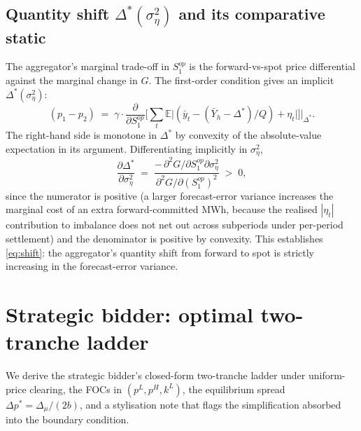 \documentclass[11pt]{article}
\begin{document}
\subsection{Quantity shift $\Delta^*(\sigma_\eta^2)$ and its comparative static}\label{app:aggregator:shift}
The aggregator's marginal trade-off in $S^{op}_1$ is the forward-vs-spot price differential against the marginal change in $G$. The first-order condition gives an implicit $\Delta^*(\sigma_\eta^2)$:
\begin{equation}
(p_1 - p_2) \;=\; \gamma \cdot \frac{\partial}{\partial S^{op}_1}\!\bigg[\sum_t \mathbb{E}\big|(\bar y_t - (\bar Y_h - \Delta^*)/Q) + \eta_t\big|\bigg]\bigg|_{\Delta^*}.
\label{eq:agg-foc}
\end{equation}
The right-hand side is monotone in $\Delta^*$ by convexity of the absolute-value expectation in its argument. Differentiating implicitly in $\sigma_\eta^2$,
\[
\frac{\partial \Delta^*}{\partial \sigma_\eta^2} \;=\; \frac{-\,\partial^2 G/\partial S^{op}_1 \partial \sigma_\eta^2}{\partial^2 G / \partial (S^{op}_1)^2} \;>\; 0,
\]
since the numerator is positive (a larger forecast-error variance increases the marginal cost of an extra forward-committed MWh, because the realised $|\eta_t|$ contribution to imbalance does not net out across subperiods under per-period settlement) and the denominator is positive by convexity. This establishes \eqref{eq:shift}: the aggregator's quantity shift from forward to spot is strictly increasing in the forecast-error variance.

\section{Strategic bidder: optimal two-tranche ladder}\label{app:tranche}

We derive the strategic bidder's closed-form two-tranche ladder under uniform-price clearing, the FOCs in $(p^L, p^H, k^L)$, the equilibrium spread $\Delta p^* = \Delta_\mu/(2 b)$, and a stylisation note that flags the simplification absorbed into the boundary condition.
\end{document}
